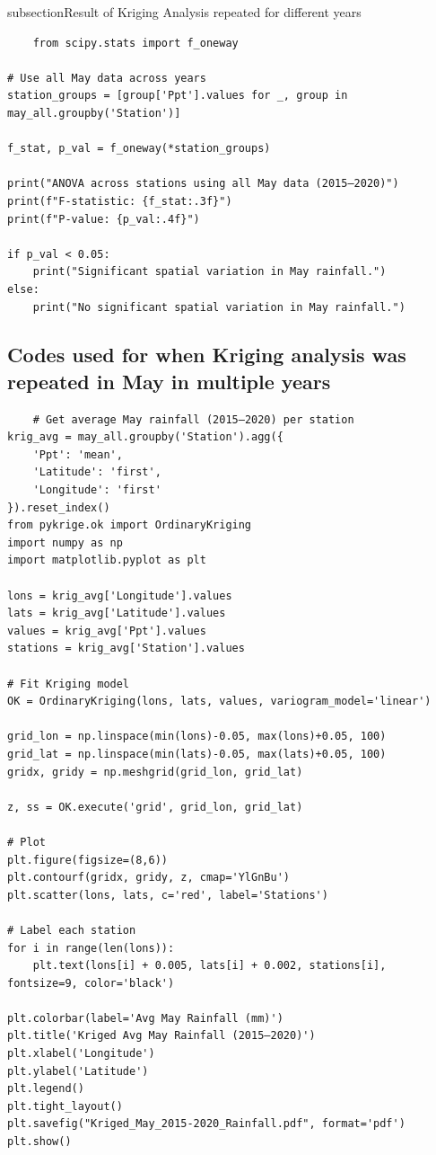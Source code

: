 \documentclass[12pt]{article}
\theoremstyle{definition}
\begin{document}
subsection{Result of Kriging Analysis repeated for different years}
\begin{verbatim}
    from scipy.stats import f_oneway

# Use all May data across years
station_groups = [group['Ppt'].values for _, group in may_all.groupby('Station')]

f_stat, p_val = f_oneway(*station_groups)

print("ANOVA across stations using all May data (2015–2020)")
print(f"F-statistic: {f_stat:.3f}")
print(f"P-value: {p_val:.4f}")

if p_val < 0.05:
    print("Significant spatial variation in May rainfall.")
else:
    print("No significant spatial variation in May rainfall.")
\end{verbatim}

\subsection{Codes used for when Kriging analysis was repeated in May in multiple years}
\begin{verbatim}
    # Get average May rainfall (2015–2020) per station
krig_avg = may_all.groupby('Station').agg({
    'Ppt': 'mean',
    'Latitude': 'first',
    'Longitude': 'first'
}).reset_index()
from pykrige.ok import OrdinaryKriging
import numpy as np
import matplotlib.pyplot as plt

lons = krig_avg['Longitude'].values
lats = krig_avg['Latitude'].values
values = krig_avg['Ppt'].values
stations = krig_avg['Station'].values

# Fit Kriging model
OK = OrdinaryKriging(lons, lats, values, variogram_model='linear')

grid_lon = np.linspace(min(lons)-0.05, max(lons)+0.05, 100)
grid_lat = np.linspace(min(lats)-0.05, max(lats)+0.05, 100)
gridx, gridy = np.meshgrid(grid_lon, grid_lat)

z, ss = OK.execute('grid', grid_lon, grid_lat)

# Plot
plt.figure(figsize=(8,6))
plt.contourf(gridx, gridy, z, cmap='YlGnBu')
plt.scatter(lons, lats, c='red', label='Stations')

# Label each station
for i in range(len(lons)):
    plt.text(lons[i] + 0.005, lats[i] + 0.002, stations[i], fontsize=9, color='black')

plt.colorbar(label='Avg May Rainfall (mm)')
plt.title('Kriged Avg May Rainfall (2015–2020)')
plt.xlabel('Longitude')
plt.ylabel('Latitude')
plt.legend()
plt.tight_layout()
plt.savefig("Kriged_May_2015-2020_Rainfall.pdf", format='pdf')
plt.show()


\end{verbatim}
\end{document}
